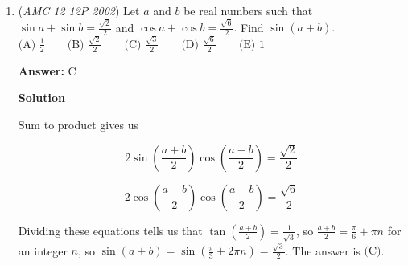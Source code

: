 \begin{enumerate}
 Then, $s=3\cdot EQ=3\cdot\frac{2\sqrt6}9=\frac{2\sqrt6}3$ and $S=3\cdot\text{inradius}=3\cdot\frac{\sqrt3}3=\sqrt3.$ Thus, $\frac{s}{S}=\frac{\frac{2\sqrt6}3}{\sqrt3}=\frac{2\sqrt2}3=\boxed{\text{(B)}}.$



	\item (\textit{AMC 12 12P 2002}) Let $a$ and $b$ be real numbers such that $\sin{a} + \sin{b} = \frac{\sqrt{2}}{2}$ and $\cos {a} + \cos {b} = \frac{\sqrt{6}}{2}.$ Find $\sin{(a+b)}.$
$\text{(A) }\frac{1}{2} \qquad \text{(B) }\frac{\sqrt{2}}{2} \qquad \text{(C) }\frac{\sqrt{3}}{2} \qquad \text{(D) }\frac{\sqrt{6}}{2} \qquad \text{(E) }1$

 \textbf{Answer: }C



\textbf{Solution}

Sum to product gives us

 
 \[2\sin(\frac{a+b}{2})\cos(\frac{a-b}{2}) = \frac{\sqrt{2}}{2}\]

 \[2\cos(\frac{a+b}{2})\cos(\frac{a-b}{2}) = \frac{\sqrt{6}}{2}\]

 Dividing these equations tells us that $\tan(\frac{a+b}{2}) = \frac{1}{\sqrt{3}}$, so $\frac{a+b}{2} = \frac{\pi}{6} + \pi n$ for an integer $n$, so $\sin(a+b) = \sin (\frac{\pi}{3} + 2\pi n) = \frac{\sqrt{3}}{2}$. The answer is $\boxed{\text{(C)}}$.

 


\end{enumerate}